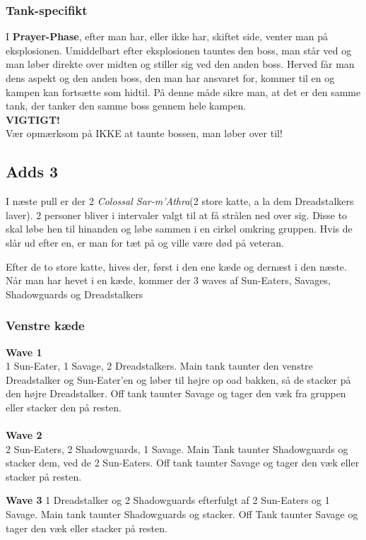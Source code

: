 \subsubsection*{Tank-specifikt}
I \textbf{Prayer-Phase}, efter man har, eller ikke har, skiftet side, venter
man på eksplosionen. Umiddelbart efter eksplosionen tauntes den boss, man står
ved og man løber direkte over midten og stiller sig ved den anden boss. Herved
får man dens aspekt og den anden boss, den man har ansvaret for, kommer til en
og kampen kan fortsætte som hidtil. På denne måde sikre man, at det er den
samme tank, der tanker den samme boss gennem hele kampen.\\
\textbf{VIGTIGT!}\\
Vær opmærksom på IKKE at taunte bossen, man løber over til!

\subsection*{Adds 3}
I næste pull er der 2 \emph{Colossal Sar-m'Athra}(2 store katte, a la dem
Dreadstalkers laver). 2 personer bliver i intervaler valgt til at få strålen
ned over sig. Disse to skal løbe hen til hinanden og løbe sammen i en cirkel
omkring gruppen. Hvis de slår ud efter en, er man for tæt på og ville være død
på veteran.

Efter de to store katte, hives der, først i den ene kæde og dernæst i den
næste. Når man har hevet i en kæde, kommer der 3 waves af Sun-Eaters, Savages,
Shadowguards og Dreadstalkers

\subsubsection*{Venstre kæde}
\textbf{Wave 1}\\
1 Sun-Eater, 1 Savage, 2 Dreadstalkers. Main tank taunter den venstre
Dreadstalker og Sun-Eater'en og løber til højre op oad bakken, så de stacker på
den højre Dreadstalker. Off tank taunter Savage og tager den væk fra gruppen
eller stacker den på resten.\\
\\
\textbf{Wave 2}\\
2 Sun-Eaters, 2 Shadowguards, 1 Savage. Main Tank taunter Shadowguards og
stacker dem, ved de 2 Sun-Eaters. Off tank taunter Savage og tager den væk
eller stacker på resten.

\textbf{Wave 3}
1 Dreadstalker og 2 Shadowguards efterfulgt af 2 Sun-Eaters og 1 Savage. 
Main tank taunter Shadowguards og stacker. Off Tank taunter Savage og tager den
væk eller stacker på resten.

